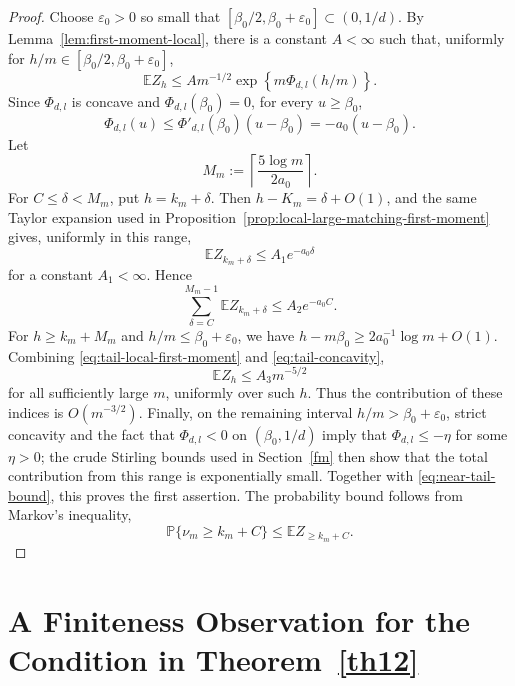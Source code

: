 \documentclass[11pt]{amsart}
\theoremstyle{plain}
\numberwithin{equation}{section}
\numberwithin{theorem}{section}
\numberwithin{figure}{section}
\begin{document}
\begin{proof}
Choose \(\varepsilon_0>0\) so small that
\([\beta_0/2,\beta_0+\varepsilon_0]\subset(0,1/d)\).  By Lemma~\ref{lem:first-moment-local},
there is a constant \(A<\infty\) such that, uniformly for
\(h/m\in[\beta_0/2,\beta_0+\varepsilon_0]\),
\begin{equation}
  \mathbb E Z_h
  \le A m^{-1/2}\exp\left\{m\Phi_{d,l}(h/m)\right\} .
\label{eq:tail-local-first-moment}
\end{equation}
Since \(\Phi_{d,l}\) is concave and \(\Phi_{d,l}(\beta_0)=0\), for every
\(u\ge\beta_0\),
\begin{equation}
  \Phi_{d,l}(u)\le \Phi'_{d,l}(\beta_0)(u-\beta_0)=-a_0(u-\beta_0).
\label{eq:tail-concavity}
\end{equation}
Let
\[
  M_m:=\left\lceil \frac{5\log m}{2a_0}\right\rceil .
\]
For \(C\le \delta<M_m\), put \(h=k_m+\delta\).  Then
\(h-K_m=\delta+O(1)\), and the same Taylor expansion used in
Proposition~\ref{prop:local-large-matching-first-moment} gives, uniformly in this range,
\[
  \mathbb E Z_{k_m+\delta}
  \le A_1 e^{-a_0\delta}
\]
for a constant \(A_1<\infty\).  Hence
\begin{equation}
  \sum_{\delta=C}^{M_m-1}\mathbb E Z_{k_m+\delta}
  \le A_2 e^{-a_0 C}.
\label{eq:near-tail-bound}
\end{equation}
For \(h\ge k_m+M_m\) and \(h/m\le\beta_0+\varepsilon_0\), we have
\(h-m\beta_0\ge 2a_0^{-1}\log m+O(1)\).  Combining
\eqref{eq:tail-local-first-moment} and \eqref{eq:tail-concavity},
\[
  \mathbb E Z_h\le A_3 m^{-5/2}
\]
for all sufficiently large \(m\), uniformly over such \(h\).  Thus the contribution of these
indices is \(O(m^{-3/2})\).  Finally, on the remaining interval
\(h/m>\beta_0+\varepsilon_0\), strict concavity and the fact that \(\Phi_{d,l}<0\) on
\((\beta_0,1/d)\) imply that \(\Phi_{d,l}\le-\eta\) for some \(\eta>0\); the crude
Stirling bounds used in Section~\ref{fm} then show that the total contribution from this
range is exponentially small.  Together with \eqref{eq:near-tail-bound}, this proves the
first assertion.  The probability bound follows from Markov's inequality,
\[\mathbb P\{\nu_m\ge k_m+C\}\le \mathbb E Z_{\ge k_m+C}.\]
\end{proof}

\appendix

\section{\texorpdfstring{A Finiteness Observation for the Condition in Theorem~\ref{th12}}{A Finiteness Observation for the Condition in Theorem 1.2}}\label{sect:A}
\end{document}
